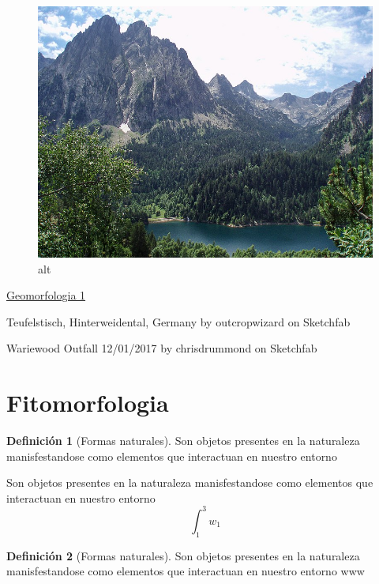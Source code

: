 \documentclass[16pt,]{krantz}
\theoremstyle{definition}
\newtheorem{definition}{Definición}[chapter]
\theoremstyle{definition}
\theoremstyle{definition}
\theoremstyle{definition}
\theoremstyle{remark}
\begin{document}
\begin{figure}
\centering
\includegraphics{geomorfo.jpeg}
\caption{alt}
\end{figure}

\href{https://sketchfab.com/3d-models/eldgos-i-geldingadolum-a-reykjanesskaga-7bcb3d856e1947a4a78c1810f559b3ea}{Geomorfologia 1}

Teufelstisch, Hinterweidental, Germany by outcropwizard on Sketchfab

Wariewood Outfall 12/01/2017 by chrisdrummond on Sketchfab

\hypertarget{fitomorfologia}{%
\section{Fitomorfologia}\label{fitomorfologia}}

\begin{definition}[Formas naturales]
\protect\hypertarget{def:ww3}{}{\label{def:ww3} {} }Son objetos presentes en la naturaleza manisfestandose como elementos que interactuan en nuestro entorno
\end{definition}
Son objetos presentes en la naturaleza manisfestandose como elementos que interactuan en nuestro entorno \[ \int_{1}^{3}w_1 \]

\begin{definition}[Formas naturales]
\protect\hypertarget{def:w3w}{}{\label{def:w3w} {} }Son objetos presentes en la naturaleza manisfestandose como elementos que interactuan en nuestro entorno www
\end{definition}
\end{document}
